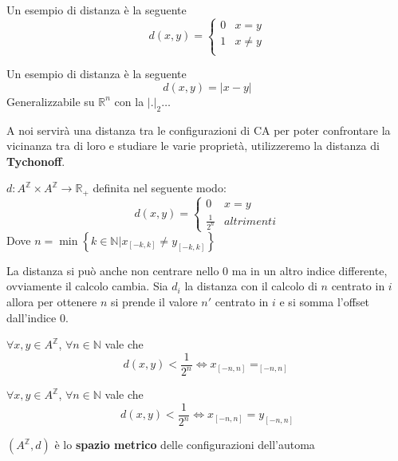 \begin{esempio}
    Un esempio di distanza è la seguente
    $$d(x,y) =\begin{cases}
            0 & x=y    \\
            1 & x\ne y \\
        \end{cases}$$
\end{esempio}

\begin{esempio}
    Un esempio di distanza è la seguente
    $$d(x,y) =|x-y|$$
    Generalizzabile su $\mathbb{R}^n$ con la $|.|_2$$\dots$
\end{esempio}

A noi servirà una distanza tra le configurazioni di CA per poter confrontare
la vicinanza tra di loro e studiare le varie proprietà, utilizzeremo la distanza di
\textbf{Tychonoff}.
\begin{definizione} 
    $d:A^\mathbb{Z}\times A^\mathbb{Z} \rightarrow \mathbb{R}_+$ definita nel
    seguente modo:
    $$d(x,y) = \begin{cases}
            0             & x=y        \\
            \frac{1}{2^n} & altrimenti
        \end{cases}$$
    Dove $n= \min\left\{k\in \mathbb{N} | x_{[-k,k]} \ne y_{[-k,k]}\right\}$
\end{definizione}

La distanza si può anche non centrare nello $0$ ma in un altro indice differente,
ovviamente il calcolo cambia. Sia $d_i$ la distanza con il calcolo di $n$ centrato
in $i$ allora per ottenere $n$ si prende il valore $n'$ centrato in $i$ e si somma
l'offset dall'indice $0$.

\begin{nota}
    $\forall x,y\in A^\mathbb{Z}$, $\forall n\in \mathbb{N}$ vale che
    $$d(x,y)< \frac{1}{2^n}\iff x_{[-n, n]}=_{[-n, n]}$$
\end{nota}

\begin{nota}  \label{prop:dist}
    $\forall x,y\in A^\mathbb{Z}$, $\forall n\in \mathbb{N}$ vale che
    $$d(x,y)< \frac{1}{2^n}\iff x_{[-n, n]}=y_{[-n, n]}$$
\end{nota}

\begin{definizione}
    $(A^\mathbb{Z}, d)$ è lo \textbf{spazio metrico} delle configurazioni dell'automa
\end{definizione}

